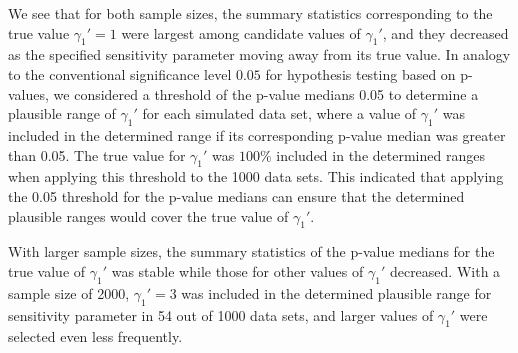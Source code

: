 \documentclass[12pt]{article}
\begin{document}



 We see that for both sample sizes, the summary statistics corresponding to the true value $\gamma_1'=1$ were largest among candidate values of $\gamma_1'$, and they decreased as the specified sensitivity parameter moving away from its true value. In analogy to the conventional significance level $0.05$ for hypothesis testing based on p-values, we considered a threshold of the p-value medians 0.05 to determine a plausible range  of $\gamma_1'$ for each simulated data set, where a value of $\gamma_1'$  was included in the determined range if its corresponding p-value median was greater than 0.05.  The true value for $\gamma_1'$ was $100\%$ included in the determined ranges when applying this threshold to the 1000 data sets. This indicated that applying the 0.05 threshold for the p-value medians can ensure that the determined plausible ranges  would cover the true value of $\gamma_1'$.

With larger sample sizes, the summary statistics of the p-value medians for the true value of $\gamma_1'$ was stable while those for other values of $\gamma_1'$ decreased. With a sample size of 2000, $\gamma_1'=3$ was included in the determined plausible range for sensitivity parameter in 54 out of 1000 data sets, and larger values of $\gamma_1'$ were selected even  less frequently.%
\end{document}
